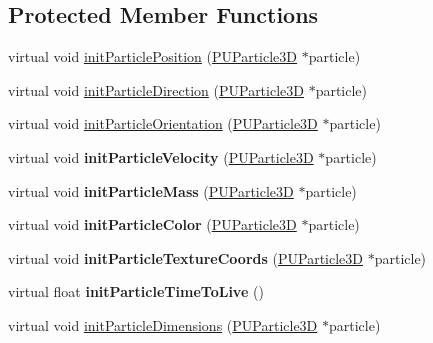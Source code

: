\subsection*{Protected Member Functions}
\begin{DoxyCompactItemize}
\item 
virtual void \hyperlink{classPUEmitter_a2449f31b73c94a55f6559be71d56ca61}{init\+Particle\+Position} (\hyperlink{structPUParticle3D}{P\+U\+Particle3D} $\ast$particle)
\item 
virtual void \hyperlink{classPUEmitter_a0dffa0a17008ddaaec73c6042ea1a019}{init\+Particle\+Direction} (\hyperlink{structPUParticle3D}{P\+U\+Particle3D} $\ast$particle)
\item 
virtual void \hyperlink{classPUEmitter_a20df7b8fc3cfad55e074fd7373185c45}{init\+Particle\+Orientation} (\hyperlink{structPUParticle3D}{P\+U\+Particle3D} $\ast$particle)
\item 
\mbox{\label{classPUEmitter_a009ddc7994f0b80a57642eb7690a00cc}} 
virtual void {\bfseries init\+Particle\+Velocity} (\hyperlink{structPUParticle3D}{P\+U\+Particle3D} $\ast$particle)
\item 
\mbox{\label{classPUEmitter_a43bed3fcfdab7531b70db0bfa5d2439e}} 
virtual void {\bfseries init\+Particle\+Mass} (\hyperlink{structPUParticle3D}{P\+U\+Particle3D} $\ast$particle)
\item 
\mbox{\label{classPUEmitter_a47c73b3ff2accc9e1a8f8f2c8cbf491b}} 
virtual void {\bfseries init\+Particle\+Color} (\hyperlink{structPUParticle3D}{P\+U\+Particle3D} $\ast$particle)
\item 
\mbox{\label{classPUEmitter_a1a87ac97818babc769bc63263e2db42c}} 
virtual void {\bfseries init\+Particle\+Texture\+Coords} (\hyperlink{structPUParticle3D}{P\+U\+Particle3D} $\ast$particle)
\item 
\mbox{\label{classPUEmitter_a328b5641e88dac0e910f3a3f487296c7}} 
virtual float {\bfseries init\+Particle\+Time\+To\+Live} ()
\item 
virtual void \hyperlink{classPUEmitter_ad3affd063a8152664e3eb8902812c1ba}{init\+Particle\+Dimensions} (\hyperlink{structPUParticle3D}{P\+U\+Particle3D} $\ast$particle)
\item 
\mbox{\label{classPUEmitter_abb4d7200b545f0a90ecce845687fddac}} 

\end{DoxyCompactItemize}
